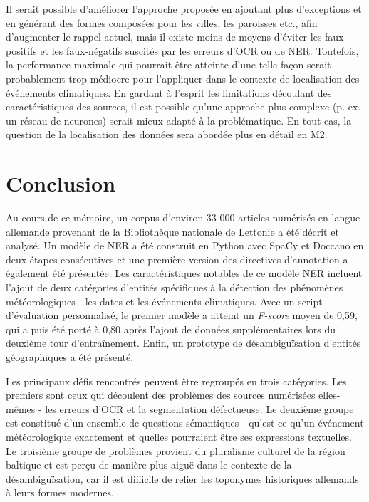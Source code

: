 \documentclass[a4paper,twoside,12pt]{article}
\begin{document}
Il serait possible d'améliorer l'approche proposée en ajoutant plus d'exceptions et en générant des formes composées pour les villes, les paroisses etc., afin d'augmenter le rappel actuel, mais il existe moins de moyens d'éviter les faux-positifs et les faux-négatifs suscités par les erreurs d'OCR ou de NER. Toutefois, la performance maximale qui pourrait être atteinte d'une telle façon serait probablement trop médiocre pour l'appliquer dans le contexte de localisation des événements climatiques. En gardant à l'esprit les limitations découlant des caractéristiques des sources, il est possible qu'une approche plus complexe (p. ex. un réseau de neurones) serait mieux adapté à la problématique. En tout cas, la question de la localisation des données sera abordée plus en détail en M2.

\clearpage

\section*{Conclusion}

Au cours de ce mémoire, un corpus d'environ 33 000 articles numérisés en langue allemande provenant de la Bibliothèque nationale de Lettonie a été décrit et analysé. Un modèle de NER a été construit en Python avec SpaCy et Doccano en deux étapes consécutives et une première version des directives d'annotation a également été présentée. Les caractéristiques notables de ce modèle NER incluent l'ajout de deux catégories d'entités spécifiques à la détection des phénomènes météorologiques - les dates et les événements climatiques. Avec un script d'évaluation personnalisé, le premier modèle a atteint un \textit{F-score} moyen de 0,59, qui a puis été porté à 0,80 après l'ajout de données supplémentaires lors du deuxième tour d'entraînement. Enfin, un prototype de désambiguïsation d'entités géographiques a été présenté.

Les principaux défis rencontrés peuvent être regroupés en trois catégories. Les premiers sont ceux qui découlent des problèmes des sources numérisées elles-mêmes - les erreurs d'OCR et la segmentation défectueuse. Le deuxième groupe est constitué d'un ensemble de questions sémantiques - qu'est-ce qu'un événement météorologique exactement et quelles pourraient être ses expressions textuelles. Le troisième groupe de problèmes provient du pluralisme culturel de la région baltique et est perçu de manière plus aiguë dans le contexte de la désambiguïsation, car il est difficile de relier les toponymes historiques allemands à leurs formes modernes.
\end{document}
